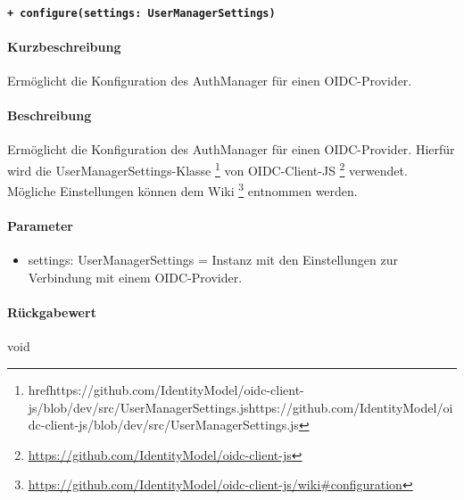 \paragraph{\texttt{+ configure(settings: UserManagerSettings)}}\label{AP_AuthManager_configure}%
\paragraph*{Kurzbeschreibung}
Ermöglicht die Konfiguration des AuthManager für einen OIDC-Provider.
\paragraph*{Beschreibung}
Ermöglicht die Konfiguration des AuthManager für einen OIDC-Provider.
Hierfür wird die UserManagerSettings-Klasse \footnote{href{https://github.com/IdentityModel/oidc-client-js/blob/dev/src/UserManagerSettings.js}{https://github.com/IdentityModel/oidc-client-js/blob/dev/src/UserManagerSettings.js}} von 
OIDC-Client-JS \footnote{\href{https://github.com/IdentityModel/oidc-client-js}{https://github.com/IdentityModel/oidc-client-js}} verwendet.
Mögliche Einstellungen können dem Wiki \footnote{\href{https://github.com/IdentityModel/oidc-client-js/wiki\#configuration}{https://github.com/IdentityModel/oidc-client-js/wiki\#configuration}} entnommen werden.
\paragraph*{Parameter}
\begin{itemize}
    \item settings: UserManagerSettings = Instanz mit den Einstellungen zur Verbindung mit einem OIDC-Provider.
\end{itemize}
\paragraph*{Rückgabewert}
void